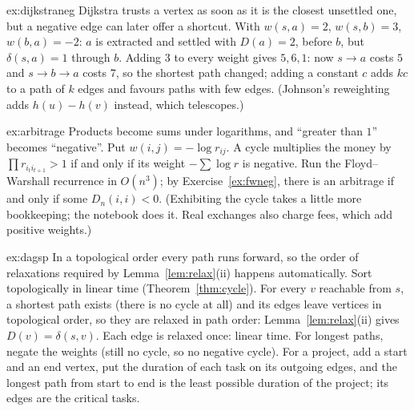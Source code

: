 \begin{solution}{ex:dijkstraneg}
\idea Dijkstra trusts a vertex as soon as it is the closest unsettled one, but a negative edge can later offer a shortcut.
\writeup With $w(s,a)=2$, $w(s,b)=3$, $w(b,a)=-2$: $a$ is extracted and settled with $D(a)=2$, before $b$, but $\delta(s,a)=1$ through $b$. Adding $3$ to every weight gives $5,6,1$: now $s\to a$ costs $5$ and $s\to b\to a$ costs $7$, so the shortest path changed; adding a
constant $c$ adds $kc$ to a path of $k$ edges and favours paths with few edges. (Johnson's reweighting adds $h(u)-h(v)$ instead, which telescopes.)
\end{solution}

\begin{solution}{ex:arbitrage}
\idea Products become sums under logarithms, and ``greater than $1$'' becomes ``negative''.
\writeup Put $w(i,j)=-\log r_{ij}$. A cycle multiplies the money by $\prod r_{i_ti_{t+1}}>1$ if and only if its weight $-\sum\log r$ is negative. Run the Floyd--Warshall recurrence in $O(n^3)$; by Exercise~\ref{ex:fwneg}, there is
an arbitrage if and only if some $D_n(i,i)<0$. (Exhibiting the cycle takes a little more bookkeeping; the notebook does it. Real exchanges also charge fees, which add positive weights.)
\end{solution}

\begin{solution}{ex:dagsp}
\idea In a topological order every path runs forward, so the order of relaxations required by Lemma~\ref{lem:relax}(ii) happens automatically.
\writeup Sort topologically in linear time (Theorem~\ref{thm:cycle}). For every $v$ reachable from $s$, a shortest path exists (there is no cycle at all) and its edges leave vertices in topological order, so they are relaxed in path order:
Lemma~\ref{lem:relax}(ii) gives $D(v)=\delta(s,v)$. Each edge is relaxed once: linear time. For longest paths, negate the weights (still no cycle, so no negative cycle). For a project, add a start and an end vertex, put the duration of each task on
its outgoing edges, and the longest path from start to end is the least possible duration of the project; its edges are the critical tasks.
\end{solution}

